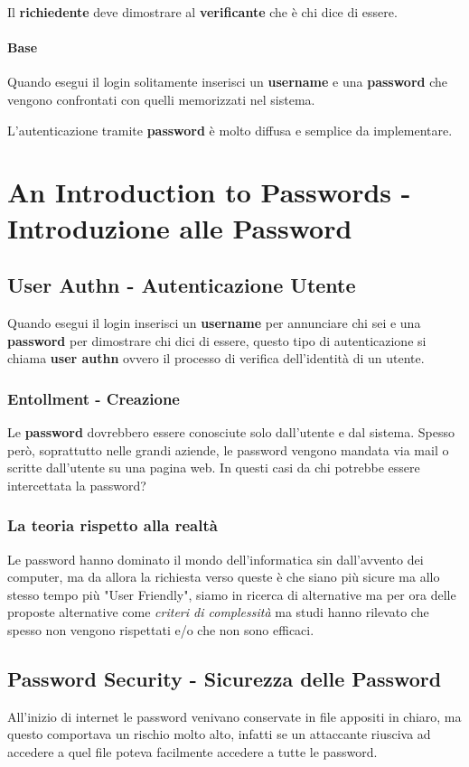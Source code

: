            Il \textbf{richiedente} deve dimostrare al \textbf{verificante} che è chi dice di essere.
            \paragraph{Base} Quando esegui il login solitamente inserisci un \textbf{username} e una \textbf{password} che vengono confrontati con quelli memorizzati nel sistema.

            L'autenticazione tramite \textbf{password} è molto diffusa e semplice da implementare.
\section{An Introduction to Passwords - Introduzione alle Password}
    \subsection{User Authn - Autenticazione Utente}
        Quando esegui il login inserisci un \textbf{username} per annunciare chi sei e una \textbf{password} per dimostrare chi dici di essere, questo tipo di autenticazione si chiama \textbf{user authn} ovvero il processo di verifica dell'identità di un utente.
        \subsubsection{Entollment - Creazione}
            Le \textbf{password} dovrebbero essere conosciute solo dall'utente e dal sistema. Spesso però, soprattutto nelle grandi aziende, le password vengono mandata via mail o scritte dall'utente su una pagina web. In questi casi da chi potrebbe essere intercettata la password?
        \subsubsection{La teoria rispetto alla realtà}
            Le password hanno dominato il mondo dell'informatica sin dall'avvento dei computer, ma da allora la richiesta verso queste è che siano più sicure ma allo stesso tempo più "User Friendly", siamo in ricerca di alternative ma per ora delle proposte alternative come \textit{criteri di complessità} ma studi hanno rilevato che spesso non vengono rispettati e/o che non sono efficaci. 
    \subsection{Password Security - Sicurezza delle Password}
        All'inizio di internet le password venivano conservate in file appositi in chiaro, ma questo comportava un rischio molto alto, infatti se un attaccante riusciva ad accedere a quel file poteva facilmente accedere a tutte le password.


